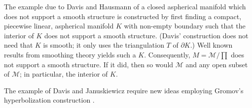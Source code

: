 \begin{remark}\label{c3:rem2}
  The example due to Davis and Hausmann \cite{23} of a closed
  aspherical manifold which does not support a smooth structure is
  constructed by first finding a compact, piecewise linear, aspherical
  manifold $K$ with non-empty boundary such that the interior of $K$
  does not support a smooth structure. (Davis' construction does not
  need that $K$ is smooth; it only uses the triangulation $T$ of
  $\partial K$.) Well known results from smoothing theory yields such
  a $K$. Consequently, $M = \mathcal{M}/\prod$ does not support a
  smooth structure. If it did, then so would $\mathcal{M}$ and any
  open subset of $\mathcal{M}$; in particular, the interior of $K$.
\end{remark}

\begin{remark}\label{c3:rem3}
  The example of Davis and Januskiewicz \cite{24} require new ideas
  employing Gromov's hyperbolization construction \cite{54}.
\end{remark}
